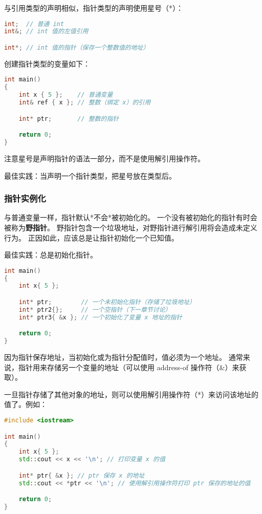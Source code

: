 \documentclass[../../LearnCpp.tex]{subfiles}
\begin{document}
与引用类型的声明相似，指针类型的声明使用星号（*）：

\begin{lstlisting}[language=C++]
int;  // 普通 int
int&; // int 值的左值引用

int*; // int 值的指针（保存一个整数值的地址）
\end{lstlisting}

创建指针类型的变量如下：

\begin{lstlisting}[language=C++]
int main()
{
    int x { 5 };    // 普通变量
    int& ref { x }; // 整数（绑定 x）的引用

    int* ptr;       // 整数的指针

    return 0;
}
\end{lstlisting}

注意星号是声明指针的语法一部分，而不是使用解引用操作符。

最佳实践：当声明一个指针类型，把星号放在类型后。

\subsubsection*{指针实例化}

与普通变量一样，指针默认*不会*被初始化的。
一个没有被初始化的指针有时会被称为\textbf{野指针}。
野指针包含一个垃圾地址，对野指针进行解引用将会造成未定义行为。
正因如此，应该总是让指针初始化一个已知值。

最佳实践：总是初始化指针。

\begin{lstlisting}[language=C++]
int main()
{
    int x{ 5 };

    int* ptr;        // 一个未初始化指针（存储了垃圾地址）
    int* ptr2{};     // 一个空指针（下一章节讨论）
    int* ptr3{ &x }; // 一个初始化了变量 x 地址的指针

    return 0;
}
\end{lstlisting}

因为指针保存地址，当初始化或为指针分配值时，值必须为一个地址。
通常来说，指针用来存储另一个变量的地址（可以使用 address-of 操作符（\&）来获取）。

一旦指针存储了其他对象的地址，则可以使用解引用操作符（*）来访问该地址的值了。例如：

\begin{lstlisting}[language=C++]
#include <iostream>

int main()
{
    int x{ 5 };
    std::cout << x << '\n'; // 打印变量 x 的值

    int* ptr{ &x }; // ptr 保存 x 的地址
    std::cout << *ptr << '\n'; // 使用解引用操作符打印 ptr 保存的地址的值

    return 0;
}
\end{lstlisting}
\end{document}
